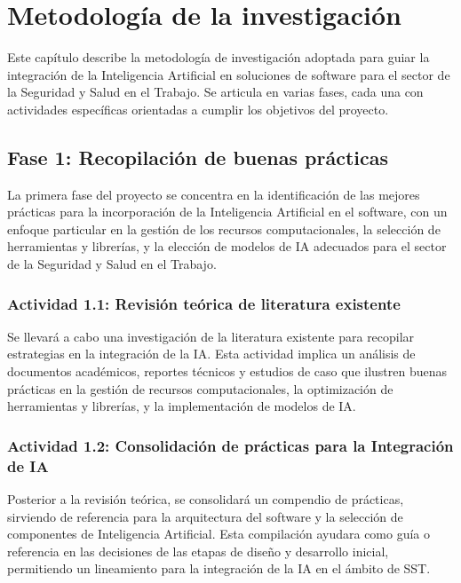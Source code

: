 \section{Metodología de la investigación}
\label{sec:metodologia}

Este capítulo describe la metodología de investigación adoptada para guiar la integración de la Inteligencia Artificial en soluciones de software para el sector de la Seguridad y Salud en el Trabajo. Se articula en varias fases, cada una con actividades específicas orientadas a cumplir los objetivos del proyecto.

\subsection{Fase 1: Recopilación de buenas prácticas}
La primera fase del proyecto se concentra en la identificación de las mejores prácticas para la incorporación de la Inteligencia Artificial en el software, con un enfoque particular en la gestión de los recursos computacionales, la selección de herramientas y librerías, y la elección de modelos de IA adecuados para el sector de la Seguridad y Salud en el Trabajo.

\subsubsection{Actividad 1.1: Revisión teórica de literatura existente}
Se llevará a cabo una investigación de la literatura existente para recopilar estrategias en la integración de la IA. Esta actividad implica un análisis de documentos académicos, reportes técnicos y estudios de caso que ilustren buenas prácticas en la gestión de recursos computacionales, la optimización de herramientas y librerías, y la implementación de modelos de IA.

\subsubsection{Actividad 1.2: Consolidación de prácticas para la Integración de IA}
Posterior a la revisión teórica, se consolidará un compendio de prácticas, sirviendo de referencia para la arquitectura del software y la selección de componentes de Inteligencia Artificial. Esta compilación ayudara como guía o referencia en las decisiones de las etapas de diseño y desarrollo inicial, permitiendo un lineamiento para la integración de la IA en el ámbito de SST.





